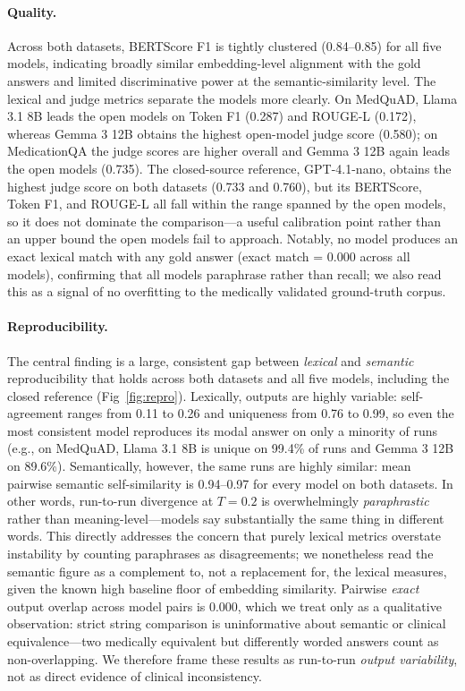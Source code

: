 \documentclass[10pt,letterpaper]{article}
\begin{document}
\paragraph{Quality.}
Across both datasets, BERTScore F1 is tightly clustered (0.84--0.85)
for all five models, indicating broadly similar embedding-level
alignment with the gold answers and limited discriminative power at the
semantic-similarity level. The lexical and judge metrics separate the
models more clearly. On MedQuAD, Llama 3.1 8B leads the open models on
Token F1 (0.287) and ROUGE-L (0.172), whereas Gemma 3 12B obtains the
highest open-model judge score (0.580); on MedicationQA the judge scores
are higher overall and Gemma 3 12B again leads the open models (0.735).
The closed-source reference, GPT-4.1-nano, obtains the highest judge
score on both datasets (0.733 and 0.760), but its BERTScore, Token F1,
and ROUGE-L all fall within the range spanned by the open models, so it
does not dominate the comparison---a useful calibration point rather
than an upper bound the open models fail to approach.
Notably, no model produces an exact lexical match with any gold
answer (exact match = 0.000 across all models), confirming that all
models paraphrase rather than recall; we also read this as a signal of
no overfitting to the medically validated ground-truth corpus.

\paragraph{Reproducibility.}
The central finding is a large, consistent gap between \emph{lexical}
and \emph{semantic} reproducibility that holds across both datasets and
all five models, including the closed reference (Fig~\ref{fig:repro}).
Lexically, outputs are highly variable: self-agreement ranges from 0.11
to 0.26 and uniqueness from 0.76 to 0.99, so even the most consistent
model reproduces its modal answer on only a minority of runs (e.g., on
MedQuAD, Llama 3.1 8B is unique on 99.4\% of runs and Gemma 3 12B on
89.6\%). Semantically, however, the same runs are highly similar: mean
pairwise semantic self-similarity is 0.94--0.97 for every model on both
datasets. In other words, run-to-run divergence at $T{=}0.2$ is
overwhelmingly \emph{paraphrastic} rather than meaning-level---models
say substantially the same thing in different words. This directly
addresses the concern that purely lexical metrics overstate instability
by counting paraphrases as disagreements; we nonetheless read the
semantic figure as a complement to, not a replacement for, the lexical
measures, given the known high baseline floor of embedding similarity.
Pairwise \emph{exact} output overlap across model pairs is 0.000, which
we treat only as a qualitative observation: strict string comparison is
uninformative about semantic or clinical equivalence---two medically
equivalent but differently worded answers count as non-overlapping. We
therefore frame these results as run-to-run \emph{output variability},
not as direct evidence of clinical inconsistency.
\end{document}
